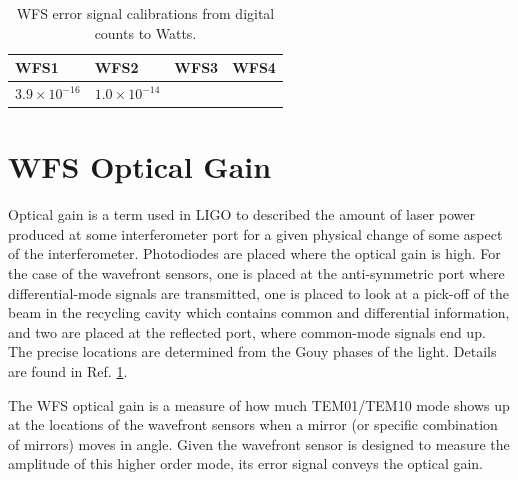 \begin{table}
\centering
\caption[]{WFS error signal calibrations from digital counts to Watts.}
\begin{tabular}{l l l l}
\hline
WFS1 & WFS2 & WFS3 & WFS4 \\
\hline
$3.9\times10^{-16}$ & $1.0\times10^{-14}$ & & \\
\hline
\end{tabular}
\label{table:WFScal}
\end{table}






\section{WFS Optical Gain}
Optical gain is a term used in LIGO to described the amount of laser
power produced at some interferometer port for a given physical change
of some aspect of the interferometer. Photodiodes are placed where the
optical gain is high. For the case of the wavefront sensors, one is
placed at the anti-symmetric port where differential-mode signals are
transmitted, one is placed to look at a pick-off of the beam in the
recycling cavity which contains common and differential information,
and two are placed at the reflected port, where common-mode signals
end up. The precise locations are determined from the Gouy phases of
the light. Details are found in Ref. \ref{}.


The WFS optical gain is a measure of how much TEM01/TEM10 mode shows
up at the locations of the wavefront sensors when a mirror (or
specific combination of mirrors) moves in angle. Given the wavefront
sensor is designed to measure the amplitude of this higher order mode,
its error signal conveys the optical gain.

